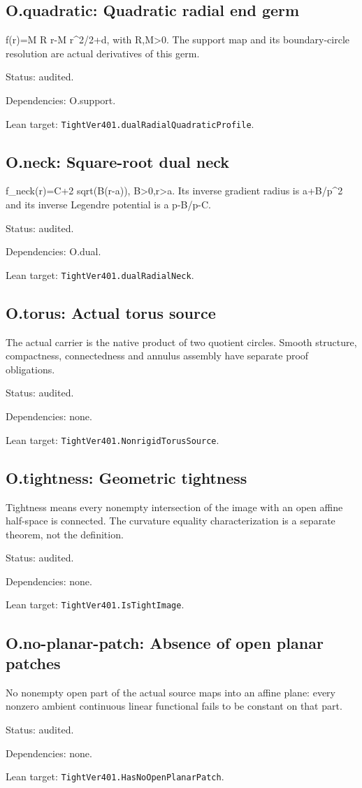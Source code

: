 \documentclass{article}
\begin{document}
\subsection*{O.quadratic: Quadratic radial end germ}
f(r)=M R r-M r^2/2+d, with R,M>0. The support map and its boundary-circle resolution are actual derivatives of this germ.
\par Status: audited.
\par Dependencies: O.support.
\par Lean target: \texttt{TightVer401.dualRadialQuadraticProfile}.
\subsection*{O.neck: Square-root dual neck}
f\_neck(r)=C+2 sqrt(B(r-a)), B>0,r>a. Its inverse gradient radius is a+B/p^2 and its inverse Legendre potential is a p-B/p-C.
\par Status: audited.
\par Dependencies: O.dual.
\par Lean target: \texttt{TightVer401.dualRadialNeck}.
\subsection*{O.torus: Actual torus source}
The actual carrier is the native product of two quotient circles. Smooth structure, compactness, connectedness and annulus assembly have separate proof obligations.
\par Status: audited.
\par Dependencies: none.
\par Lean target: \texttt{TightVer401.NonrigidTorusSource}.
\subsection*{O.tightness: Geometric tightness}
Tightness means every nonempty intersection of the image with an open affine half-space is connected. The curvature equality characterization is a separate theorem, not the definition.
\par Status: audited.
\par Dependencies: none.
\par Lean target: \texttt{TightVer401.IsTightImage}.
\subsection*{O.no-planar-patch: Absence of open planar patches}
No nonempty open part of the actual source maps into an affine plane: every nonzero ambient continuous linear functional fails to be constant on that part.
\par Status: audited.
\par Dependencies: none.
\par Lean target: \texttt{TightVer401.HasNoOpenPlanarPatch}.
\end{document}
